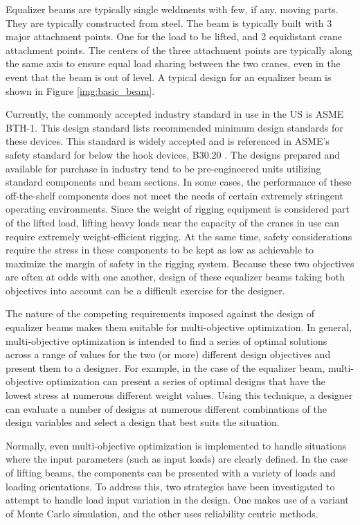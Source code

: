 Equalizer beams are typically single weldments with few, if any, moving parts. They are typically constructed from steel. The beam is typically built with 3 major attachment points. One for the load to be lifted, and 2 equidistant crane attachment points. The centers of the three attachment points are typically along the same axis to ensure equal load sharing between the two cranes, even in the event that the beam is out of level. A typical design for an equalizer beam is shown in Figure \ref{img:basic_beam}. 

Currently, the commonly accepted industry standard in use in the US is ASME BTH-1\cite{asme-bth-1}. This design standard lists recommended minimum design standards for these devices. This standard is widely accepted and is referenced in ASME's safety standard for below the hook devices, B30.20 \cite{asme-b30-20}. The designs prepared and available for purchase in industry tend to be pre-engineered units utilizing standard components and beam sections. In some cases, the performance of these off-the-shelf components does not meet the needs of certain extremely stringent operating environments. Since the weight of rigging equipment is considered part of the lifted load, lifting heavy loads near the capacity of the cranes in use can require extremely weight-efficient rigging. At the same time, safety considerations require the stress in these components to be kept as low as achievable to maximize the margin of safety in the rigging system. Because these two objectives are often at odds with one another, design of these equalizer beams taking both objectives into account can be a difficult exercise for the designer. 

The nature of the competing requirements imposed against the design of equalizer beams makes them suitable for multi-objective optimization. In general, multi-objective optimization is intended to find a series of optimal solutions across a range of values for the two (or more) different design objectives and present them to a designer. For example, in the case of the equalizer beam, multi-objective optimization can present a series of optimal designs that have the lowest stress at numerous different weight values.  Using this technique, a designer can evaluate a number of designs at numerous different combinations of the design variables and select a design that best suits the situation. 

Normally, even multi-objective optimization is implemented to handle situations where the input parameters (such as input loads) are clearly defined. In the case of lifting beams, the components can be presented with a variety of loads and loading orientations. To address this, two strategies have been investigated to attempt to handle load input variation in the design. One makes use of a variant of Monte Carlo simulation, and the other uses reliability centric methods. 
